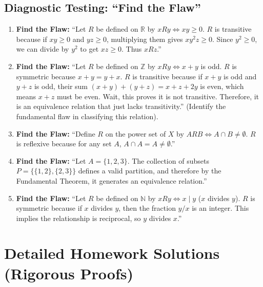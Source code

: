 \documentclass[11pt, a4paper]{article}
\theoremstyle{definition}
\theoremstyle{remark}
\newcommand{\R}{\mathbb{R}}
\newcommand{\N}{\mathbb{N}}
\newcommand{\Z}{\mathbb{Z}}
\begin{document}
\subsection{Diagnostic Testing: ``Find the Flaw''}
\begin{enumerate}[label=\textbf{\arabic*.}, start=26]
    \item \textbf{Find the Flaw:} ``Let $R$ be defined on $\R$ by $xRy \iff xy \ge 0$. $R$ is transitive because if $xy \ge 0$ and $yz \ge 0$, multiplying them gives $xy^2z \ge 0$. Since $y^2 \ge 0$, we can divide by $y^2$ to get $xz \ge 0$. Thus $xRz$.''
    \item \textbf{Find the Flaw:} ``Let $R$ be defined on $\Z$ by $xRy \iff x+y$ is odd. $R$ is symmetric because $x+y = y+x$. $R$ is transitive because if $x+y$ is odd and $y+z$ is odd, their sum $(x+y)+(y+z) = x+z+2y$ is even, which means $x+z$ must be even. Wait, this proves it is not transitive. Therefore, it is an equivalence relation that just lacks transitivity.'' (Identify the fundamental flaw in classifying this relation).
    \item \textbf{Find the Flaw:} ``Define $R$ on the power set of $X$ by $A R B \iff A \cap B \neq \emptyset$. $R$ is reflexive because for any set $A$, $A \cap A = A \neq \emptyset$.''
    \item \textbf{Find the Flaw:} ``Let $A = \{1, 2, 3\}$. The collection of subsets $P = \{\{1, 2\}, \{2, 3\}\}$ defines a valid partition, and therefore by the Fundamental Theorem, it generates an equivalence relation.''
    \item \textbf{Find the Flaw:} ``Let $R$ be defined on $\N$ by $xRy \iff x \mid y$ ($x$ divides $y$). $R$ is symmetric because if $x$ divides $y$, then the fraction $y/x$ is an integer. This implies the relationship is reciprocal, so $y$ divides $x$.''
\end{enumerate}

\newpage

\section{Detailed Homework Solutions (Rigorous Proofs)}
\end{document}
